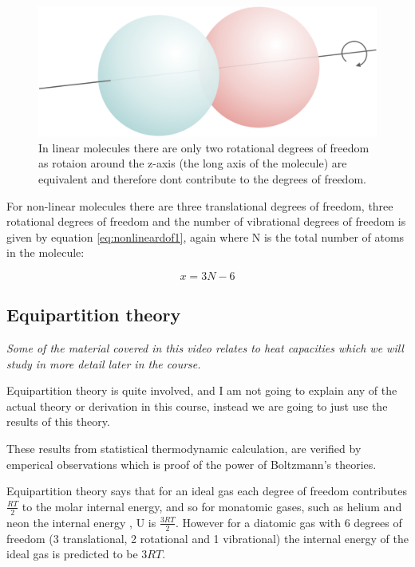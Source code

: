 \documentclass[
]{book}
\begin{document}
\begin{figure}

{\centering \includegraphics[width=0.8\linewidth]{images/linear} 

}

\caption{In linear molecules there are only two rotational degrees of freedom as rotaion around the z-axis (the long axis of the molecule) are equivalent and therefore dont contribute to the degrees of freedom.}\label{fig:linear1}
\end{figure}

For non-linear molecules there are three translational degrees of freedom, three rotational degrees of freedom and the number of vibrational degrees of freedom is given by equation \eqref{eq:nonlineardof1}, again where N is the total number of atoms in the molecule:

\begin{equation}
x = 3N-6
\label{eq:nonlineardof1}
\end{equation}

\hypertarget{equipartition-theory}{%
\subsection{Equipartition theory}\label{equipartition-theory}}

\emph{Some of the material covered in this video relates to heat capacities which we will study in more detail later in the course.}

Equipartition theory is quite involved, and I am not going to explain any of the actual theory or derivation in this course, instead we are going to just use the results of this theory.

These results from statistical thermodynamic calculation, are verified by emperical observations which is proof of the power of Boltzmann's theories.

Equipartition theory says that for an ideal gas each degree of freedom contributes \(\frac{RT}{2}\) to the molar internal energy, and so for monatomic gases, such as helium and neon the internal energy , U is \(\frac{3RT}{2}\). However for a diatomic gas with 6 degrees of freedom (3 translational, 2 rotational and 1 vibrational) the internal energy of the ideal gas is predicted to be \(3RT\).
\end{document}
